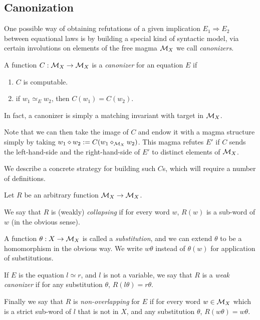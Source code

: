 \subsection{Canonization}\label{canon-sec}

One possible way of obtaining refutations of a given implication $E_1 \Rightarrow E_2$ between equational laws is by building a special kind of syntactic model, via certain involutions on elements of the free magma ${\mathcal{M}}_X$ we call \emph{canonizers}.

\begin{definition}
  A function $C:{\mathcal{M}}_X\rightarrow{\mathcal{M}}_X$ is a \emph{canonizer} for an equation $E$ if
  \begin{enumerate}
    \item $C$ is computable.
    \item if $w_1\simeq_E w_2$, then $C(w_1) = C(w_2)$.
  \end{enumerate}
\end{definition}

In fact, a canonizer is simply a matching invariant with target in ${\mathcal{M}}_X$.

Note that we can then take the image of $C$ and endow it with a magma structure simply by taking $w_1\diamond w_2 := C(w_1\diamond_{{\mathcal{M}}_X} w_2)$. This magma refutes $E'$ if $C$ sends the left-hand-side and the right-hand-side of $E'$ to distinct elements of ${\mathcal{M}}_X$.

We describe a concrete strategy for building such $C$s, which will require a number of definitions.

Let $R$ be an arbitrary function ${\mathcal{M}}_X\rightarrow {\mathcal{M}}_X$.

\begin{definition}\label{def:canon}
  We say that $R$ is (weakly) \emph{collapsing} if for every word $w$, $R(w)$ is a sub-word of $w$ (in the obvious sense).

  A function $\theta : X\rightarrow{\mathcal{M}}_X$ is called a \emph{substitution}, and we can extend $\theta$ to be a homomorphism in the obvious way. We write $w\theta$ instead of $\theta(w)$ for application of substitutions.

  If $E$ is the equation $l\simeq r$, and $l$ is not a variable, we say that $R$ is a \emph{weak canonizer} if for any substitution $\theta$, $R(l\theta)=r\theta$.

  Finally we say that $R$ is \emph{non-overlapping} for $E$ if for every word $w\in{\mathcal{M}}_X$ which is a strict sub-word of $l$ that is not in $X$, and any substitution $\theta$, $R(w\theta) = w\theta$.
\end{definition}


